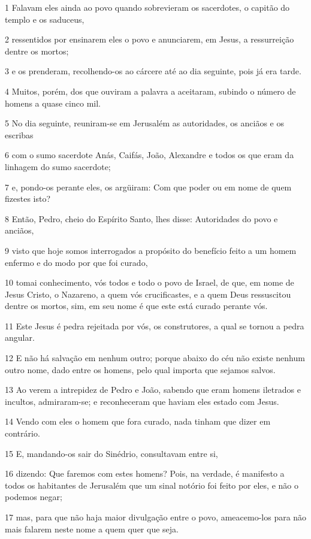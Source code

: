 \par 1 Falavam eles ainda ao povo quando sobrevieram os sacerdotes, o capitão do templo e os saduceus,
\par 2 ressentidos por ensinarem eles o povo e anunciarem, em Jesus, a ressurreição dentre os mortos;
\par 3 e os prenderam, recolhendo-os ao cárcere até ao dia seguinte, pois já era tarde.
\par 4 Muitos, porém, dos que ouviram a palavra a aceitaram, subindo o número de homens a quase cinco mil.
\par 5 No dia seguinte, reuniram-se em Jerusalém as autoridades, os anciãos e os escribas
\par 6 com o sumo sacerdote Anás, Caifás, João, Alexandre e todos os que eram da linhagem do sumo sacerdote;
\par 7 e, pondo-os perante eles, os argüiram: Com que poder ou em nome de quem fizestes isto?
\par 8 Então, Pedro, cheio do Espírito Santo, lhes disse: Autoridades do povo e anciãos,
\par 9 visto que hoje somos interrogados a propósito do benefício feito a um homem enfermo e do modo por que foi curado,
\par 10 tomai conhecimento, vós todos e todo o povo de Israel, de que, em nome de Jesus Cristo, o Nazareno, a quem vós crucificastes, e a quem Deus ressuscitou dentre os mortos, sim, em seu nome é que este está curado perante vós.
\par 11 Este Jesus é pedra rejeitada por vós, os construtores, a qual se tornou a pedra angular.
\par 12 E não há salvação em nenhum outro; porque abaixo do céu não existe nenhum outro nome, dado entre os homens, pelo qual importa que sejamos salvos.
\par 13 Ao verem a intrepidez de Pedro e João, sabendo que eram homens iletrados e incultos, admiraram-se; e reconheceram que haviam eles estado com Jesus.
\par 14 Vendo com eles o homem que fora curado, nada tinham que dizer em contrário.
\par 15 E, mandando-os sair do Sinédrio, consultavam entre si,
\par 16 dizendo: Que faremos com estes homens? Pois, na verdade, é manifesto a todos os habitantes de Jerusalém que um sinal notório foi feito por eles, e não o podemos negar;
\par 17 mas, para que não haja maior divulgação entre o povo, ameacemo-los para não mais falarem neste nome a quem quer que seja.
